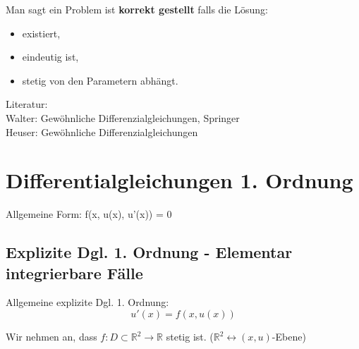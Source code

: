 \begin{definition}
Man sagt ein Problem ist \textbf{korrekt gestellt} falls die Lösung:
\begin{itemize}
    \item existiert,
    \item eindeutig ist,
    \item stetig von den Parametern abhängt.
\end{itemize}
\end{definition}

Literatur:\\
Walter: Gewöhnliche Differenzialgleichungen, Springer\\
Heuser: Gewöhnliche Differenzialgleichungen

\section{Differentialgleichungen 1. Ordnung}

Allgemeine Form: f(x, u(x), u'(x)) = 0

\subsection{Explizite Dgl. 1. Ordnung - Elementar integrierbare Fälle}

Allgemeine explizite Dgl. 1. Ordnung:
\begin{equation*}
u'(x) = f(x, u(x))
\end{equation*}


Wir nehmen an, dass $f: D \subset \mathbb{R}^2 \rightarrow \mathbb{R} $ stetig ist.
($\mathbb{R}^2 \leftrightarrow (x,u)$-Ebene)

